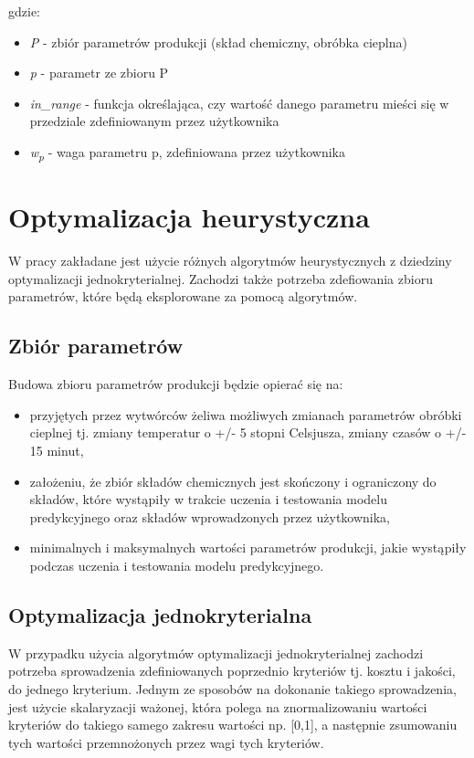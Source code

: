 gdzie:
\begin{itemize}
    \item \textit{P} - zbiór parametrów produkcji (skład chemiczny, obróbka cieplna)
    \item \textit{p} - parametr ze zbioru P
    \item \textit{in\_range} - funkcja określająca, czy wartość danego parametru mieści się w przedziale zdefiniowanym przez użytkownika
    \item \textit{w\textsubscript{p}} - waga parametru p, zdefiniowana przez użytkownika
\end{itemize}

\section{Optymalizacja heurystyczna}\label{sec:heur-opt}
W pracy zakładane jest użycie różnych algorytmów heurystycznych z dziedziny optymalizacji jednokryterialnej. Zachodzi także potrzeba zdefiowania zbioru parametrów, które będą eksplorowane za pomocą algorytmów.

\subsection{Zbiór parametrów}\label{sec:param_set}
Budowa zbioru parametrów produkcji będzie opierać się na:
\begin{itemize}
    \item przyjętych przez wytwórców żeliwa możliwych zmianach parametrów obróbki cieplnej tj. zmiany temperatur o +/- 5 stopni Celsjusza, zmiany czasów o +/- 15 minut,
    \item założeniu, że zbiór składów chemicznych jest skończony i ograniczony do składów, które wystąpiły w trakcie uczenia i testowania modelu predykcyjnego oraz składów wprowadzonych przez użytkownika,
    \item minimalnych i maksymalnych wartości parametrów produkcji, jakie wystąpiły podczas uczenia i testowania modelu predykcyjnego.
\end{itemize}

\subsection{Optymalizacja jednokryterialna}\label{sec:opt}
W przypadku użycia algorytmów optymalizacji jednokryterialnej zachodzi potrzeba sprowadzenia zdefiniowanych poprzednio kryteriów tj. kosztu i jakości, do jednego kryterium. Jednym ze sposobów na dokonanie takiego sprowadzenia, jest użycie skalaryzacji ważonej, która polega na znormalizowaniu wartości kryteriów do takiego samego zakresu wartości np. [0,1], a następnie zsumowaniu tych wartości przemnożonych przez wagi tych kryteriów.


